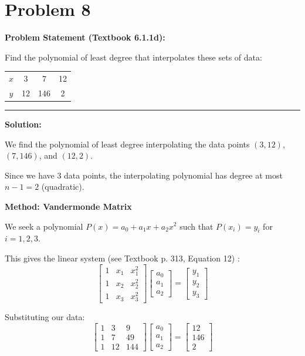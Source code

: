 \clearpage
\section*{Problem 8}

\textbf{Problem Statement (Textbook 6.1.1d):} 

Find the polynomial of least degree that interpolates these sets of data:

\begin{center}
\begin{tabular}{cccc}
$x$ & 3 & 7 & 12 \\
$y$ & 12 & 146 & 2
\end{tabular}
\end{center}

\noindent\rule{\textwidth}{0.4pt}

\vspace{1em}

\textbf{Solution:}

We find the polynomial of least degree interpolating the data points $(3, 12)$, $(7, 146)$, and $(12, 2)$.

Since we have 3 data points, the interpolating polynomial has degree at most $n-1 = 2$ (quadratic).

\textbf{Method: Vandermonde Matrix}

We seek a polynomial $P(x) = a_0 + a_1 x + a_2 x^2$ such that $P(x_i) = y_i$ for $i = 1, 2, 3$.

This gives the linear system (see Textbook p. 313, Equation 12) \cite{kincaid2009numerical}:
$$\begin{bmatrix} 
1 & x_1 & x_1^2 \\
1 & x_2 & x_2^2 \\
1 & x_3 & x_3^2
\end{bmatrix}
\begin{bmatrix} a_0 \\ a_1 \\ a_2 \end{bmatrix}
=
\begin{bmatrix} y_1 \\ y_2 \\ y_3 \end{bmatrix}$$

Substituting our data:
$$\begin{bmatrix} 
1 & 3 & 9 \\
1 & 7 & 49 \\
1 & 12 & 144
\end{bmatrix}
\begin{bmatrix} a_0 \\ a_1 \\ a_2 \end{bmatrix}
=
\begin{bmatrix} 12 \\ 146 \\ 2 \end{bmatrix}$$

